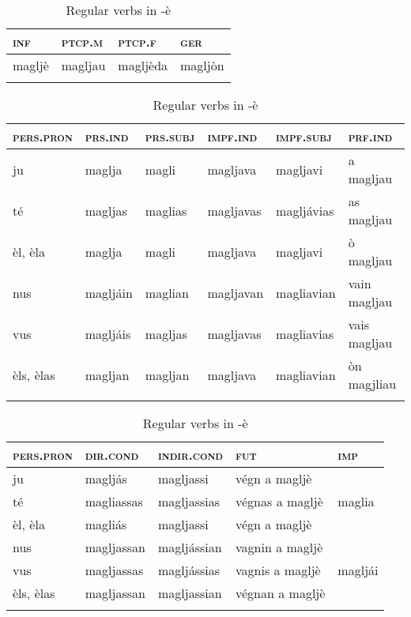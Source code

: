 \begin{table}
\caption{Regular verbs in -è}
\label{tab:reg:verb:-è}
 \begin{tabularx}{.6\textwidth}{XXXX} %
 
  \lsptoprule
  \textsc{inf}  & \textsc{ptcp.m}  & \textsc{ptcp.f}  &  \textsc{ger}\\
  \midrule
  magljè & magljau & magljèda & magljòn\\
  \lspbottomrule  
  \end{tabularx}
  
  \medskip
  
 \begin{tabularx}{\textwidth}{p{}lllll}
  \lsptoprule
\textsc{pers.pron} &\textsc{prs.ind} &\textsc{prs.subj} &\textsc{impf.ind} & \textsc{impf.subj} &\textsc{prf.ind}\\
 \midrule
ju &maglja & magli&magljava &magljavi & a magljau\\
té &magljas & maglias&magljavas &magljávias &as magljau\\
èl, èla &maglja &magli & magljava &magljavi &ò magljau\\
nus &magljáin & maglian    &magljavan &magliavian &vain magljau\\
vus &magljáis &magljas & magljavas &magliavias &vais magljau\\
èls, èlas& magljan &magljan &magljava &magliavian &òn magjliau\\
  \lspbottomrule
\end{tabularx}

\medskip

\begin{tabularx} {\textwidth}{p{2cm}XXlX}
 \lsptoprule
  \textsc{pers.pron} &\textsc{dir.cond} &  \textsc{indir.cond} & \textsc{fut}  &\textsc{imp}\\
\midrule
ju& magljás&magljassi &végn a magljè\\
té& magliassas&magljassias &végnas a magljè &maglia\\
èl, èla& magliás &magljassi &végn a magljè\\
nus& magljassan & magljássian &vagnin a magljè\\
vus& magljassas & magljássias &vagnis a magljè &magljái\\
èls, èlas& magljassan & magljassian&végnan a magljè\\
  \lspbottomrule
 \end{tabularx} 
\end{table}

